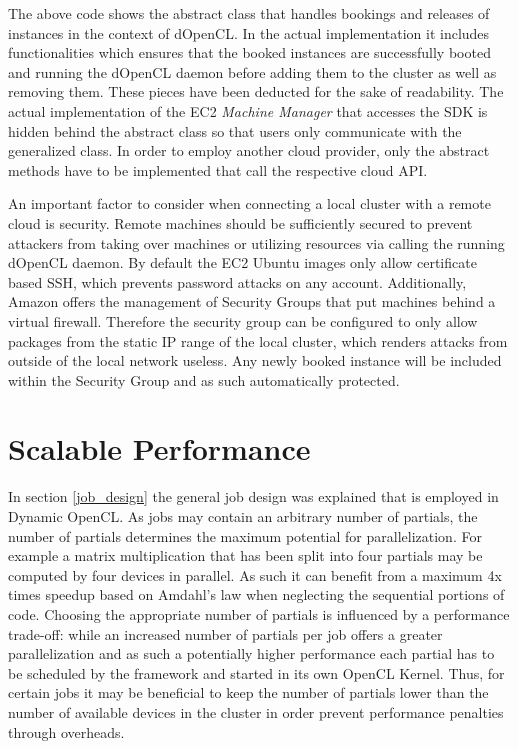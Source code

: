 The above code shows the abstract class that handles bookings and releases of instances in the context of dOpenCL. In the actual implementation it includes functionalities which ensures that the booked instances are successfully booted and running the dOpenCL daemon before adding them to the cluster as well as removing them. These pieces have been deducted for the sake of readability. The actual implementation of the EC2 \textit{Machine Manager} that accesses the SDK is hidden behind the abstract class so that users only communicate with the generalized class. In order to employ another cloud provider, only the abstract methods have to be implemented that call the respective cloud API.

An important factor to consider when connecting a local cluster with a remote cloud is security. Remote machines should be sufficiently secured to prevent attackers from taking over machines or utilizing resources via calling the running dOpenCL daemon. By default the EC2 Ubuntu images only allow certificate based SSH, which prevents password attacks on any account. Additionally, Amazon offers the management of Security Groups that put machines behind a virtual firewall. Therefore the security group can be configured to only allow packages from the static IP range of the local cluster, which renders attacks from outside of the local network useless. Any newly booked instance will be included within the Security Group and as such automatically protected.

\section{Scalable Performance}

In section \ref{job_design} the general job design was explained that is employed in Dynamic OpenCL. As jobs may contain an arbitrary number of partials, the number of partials determines the maximum potential for parallelization. For example a matrix multiplication that has been split into four partials may be computed by four devices in parallel. As such it can benefit from a maximum 4x times speedup based on Amdahl's law\cite{amdahl} when neglecting the sequential portions of code. Choosing the appropriate number of partials is influenced by a performance trade-off: while an increased number of partials per job offers a greater parallelization and as such a potentially higher performance each partial has to be scheduled by the framework and started in its own OpenCL Kernel. Thus, for certain jobs it may be beneficial to keep the number of partials lower than the number of available devices in the cluster in order prevent performance penalties through overheads.

